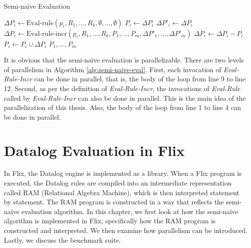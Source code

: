 \documentclass[twoside,11pt]{report}
\theoremstyle{definition}
\begin{document}
\begin{algorithm}
  \caption{Semi-naïve Evaluation}
  \begin{algorithmic}[1]
    \State $\Delta P_i \leftarrow \text{Eval-rule}(p_i, R_1, \ldots, R_k, \emptyset, \ldots, \emptyset)$
    \State $P_i \leftarrow \Delta P_i$
    \EndFor
    \Repeat
    \State $\Delta P'_i \leftarrow \Delta P_i$
    \EndFor
    \State $\Delta P_i \leftarrow \text{Eval-rule-incr}(p_i, R_1, \ldots, R_k, P_1, \ldots, P_m, \Delta P'_1, \ldots, \Delta P'_m)$
    \State $\Delta P_i \leftarrow \Delta P_i - P_i$
    \EndFor
    \State $P_i \leftarrow P_i \cup \Delta P_i$
    \EndFor
    \State \Return $P_1, \ldots, P_m$
  \end{algorithmic}
\end{algorithm}
\label{alg:semi-naive-eval}

It is obvious that the semi-naïve evaluation is parallelizable. There are two levels of parallelism in Algorithm \ref{alg:semi-naive-eval}. First, each invocation of \textit{Eval-Rule-Incr} can be done in parallel, that is, the body of the loop from line 9 to line 12. Second, as per the definition of \textit{Eval-Rule-Incr}, the invocations of \textit{Eval-Rule} called by \textit{Eval-Rule-Incr} can also be done in parallel. This is the main idea of the parallelization of this thesis. Also, the body of the loop from line 1 to line 4 can be done in parallel.



\chapter{Datalog Evaluation in Flix}
\label{ch:datalog_evaluation}

In Flix, the Datalog engine is implemented as a library. When a Flix program is executed, the Datalog rules are compiled into an intermediate representation called RAM (Relational Algebra Machine), which is then interpreted statement by statement. The RAM program is constructed in a way that reflects the semi-naïve evaluation algorithm. In this chapter, we first look at how the semi-naïve algorithm is implemented in Flix, specifically how the RAM program is constructed and interpreted. We then examine how parallelism can be introduced. Lastly, we discuss the benchmark suite.
\end{document}
